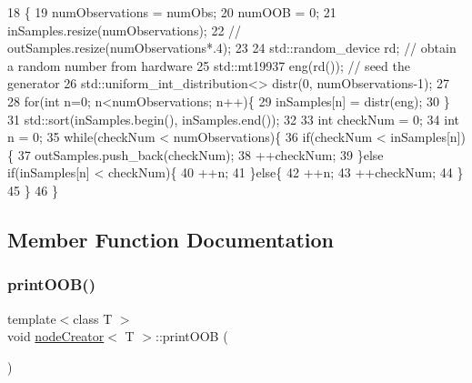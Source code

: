 \begin{DoxyCode}
18                                       \{
19             numObservations = numObs;
20             numOOB = 0;
21             inSamples.resize(numObservations);
22             \textcolor{comment}{//      outSamples.resize(numObservations*.4);}
23 
24             std::random\_device rd; \textcolor{comment}{// obtain a random number from hardware}
25             std::mt19937 eng(rd()); \textcolor{comment}{// seed the generator}
26             std::uniform\_int\_distribution<> distr(0, numObservations-1);
27 
28             \textcolor{keywordflow}{for}(\textcolor{keywordtype}{int} n=0; n<numObservations; n++)\{
29                 inSamples[n] = distr(eng);
30             \}
31             std::sort(inSamples.begin(), inSamples.end());
32 
33             \textcolor{keywordtype}{int} checkNum = 0;
34             \textcolor{keywordtype}{int} n = 0;
35             \textcolor{keywordflow}{while}(checkNum < numObservations)\{
36                 \textcolor{keywordflow}{if}(checkNum < inSamples[n])\{
37                     outSamples.push\_back(checkNum);
38                     ++checkNum;
39                 \}\textcolor{keywordflow}{else} \textcolor{keywordflow}{if}(inSamples[n] < checkNum)\{
40                     ++n;
41                 \}\textcolor{keywordflow}{else}\{
42                     ++n;
43                     ++checkNum;
44                 \}
45             \}
46         \}
\end{DoxyCode}


\subsection{Member Function Documentation}
\mbox{\label{classnodeCreator_a08702cdfc2ad2fdd010b0fdf3437d3e4}} 
\subsubsection{\texorpdfstring{print\+O\+O\+B()}{printOOB()}}
{\footnotesize\ttfamily template$<$class T $>$ \\
void \hyperlink{classnodeCreator}{node\+Creator}$<$ T $>$\+::print\+O\+OB (\begin{DoxyParamCaption}{ }\end{DoxyParamCaption})\hspace{0.3cm}{\ttfamily [inline]}}




